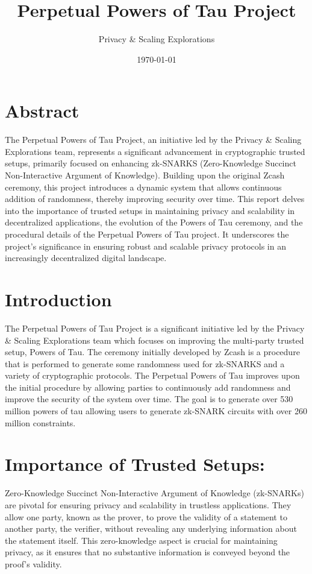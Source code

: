 \documentclass[11pt]{article}
\author{Privacy \& Scaling Explorations}
\date{\today}
\title{Perpetual Powers of Tau Project}
\begin{document}
\maketitle
\tableofcontents

\section{Abstract}
\label{sec:org05843bf}

The Perpetual Powers of Tau Project, an initiative led by the Privacy \& Scaling Explorations team, represents a significant advancement in cryptographic trusted setups, primarily focused on enhancing zk-SNARKS (Zero-Knowledge Succinct Non-Interactive Argument of Knowledge). Building upon the original Zcash ceremony, this project introduces a dynamic system that allows continuous addition of randomness, thereby improving security over time. This report delves into the importance of trusted setups in maintaining privacy and scalability in decentralized applications, the evolution of the Powers of Tau ceremony, and the procedural details of the Perpetual Powers of Tau project. It underscores the project's significance in ensuring robust and scalable privacy protocols in an increasingly decentralized digital landscape.
\section{Introduction}
\label{sec:orgbe67e3a}

The Perpetual Powers of Tau Project is a significant initiative led by the Privacy \& Scaling Explorations team which focuses on improving the multi-party trusted setup, Powers of Tau. The ceremony initially developed by Zcash is a procedure that is performed to generate some randomness used for zk-SNARKS and a variety of cryptographic protocols. The Perpetual Powers of Tau improves upon the initial procedure by allowing parties to continuously add randomness and improve the security of the system over time. The goal is to generate over 530 million powers of tau allowing users to generate zk-SNARK circuits with over 260 million constraints.
\section{Importance of Trusted Setups:}
\label{sec:org250294a}

Zero-Knowledge Succinct Non-Interactive Argument of Knowledge (zk-SNARKs) are pivotal for ensuring privacy and scalability in trustless applications. They allow one party, known as the prover, to prove the validity of a statement to another party, the verifier, without revealing any underlying information about the statement itself. This zero-knowledge aspect is crucial for maintaining privacy, as it ensures that no substantive information is conveyed beyond the proof's validity.
\end{document}
